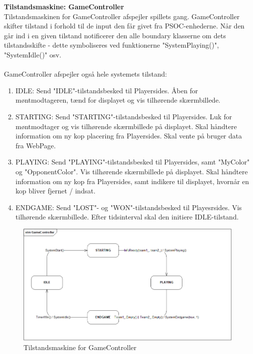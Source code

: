 \documentclass[Arkitektur/System_main.tex]{subfiles}
\begin{document}
\textbf{Tilstandsmaskine: GameController}\\
Tilstandsmaskinen for GameController afspejler spillets gang. GameController skifter tilstand i forhold til de input den får givet fra PSOC-enhederne. Når den går ind i en given tilstand notificerer den alle boundary klasserne om dets tilstandsskifte - dette symboliseres ved funktionerne "SystemPlaying()", "SystemIdle()" osv. \\\\
GameController afspejler også hele systemets tilstand:
\begin{enumerate}
    \item IDLE: Send "IDLE"-tilstandsbesked til Playersides. Åben for møntmodtageren, tænd for displayet og vis tilhørende skærmbillede. 
    \item STARTING: Send "STARTING"-tilstandsbesked til Playersides. Luk for møntmodtager og vis tilhørende skærmbillede på displayet. Skal håndtere information om ny kop placering fra Playersides. Skal vente på bruger data fra WebPage. 
    \item PLAYING: Send "PLAYING"-tilstandsbesked til Playersides, samt "MyColor" og "OpponentColor". Vis tilhørende skærmbillede på displayet. Skal håndtere information om ny kop fra Playersides, samt indikere til displayet, hvornår en kop bliver fjernet / indsat. 
    \item ENDGAME: Send "LOST"- og "WON"-tilstandsbesked til Playesrsides. Vis tilhørende skærmbillede. Efter tidsinterval skal den initiere IDLE-tilstand. 
\end{enumerate}
\begin{figure}[H]
    \centering
    \includegraphics[width=\textwidth]{Arkitektur/Softwarearkitektur/Applikationsmodel/RPi/graphics_RPi/Stm_Game.png}
    \caption{Tilstandsmaskine for GameController}
    \label{fig:stm_Game}
\end{figure}
\end{document}
